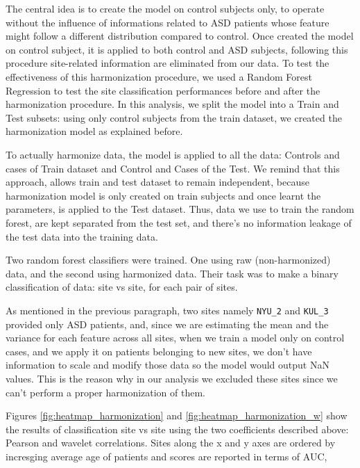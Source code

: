 \documentclass[11pt]{report}
\begin{document}
The central idea is to create the model on control subjects only, to operate without the influence of informations related to ASD patients whose feature might follow a different distribution compared to control.
Once created the model on control subject, it is applied to both control and ASD subjects, following this procedure site-related information are eliminated from our data.
To test the effectiveness of this harmonization procedure, we used a Random Forest Regression to test the site classification performances before and after the harmonization procedure.
In this analysis, we split the model into a Train and Test subsets: using only control subjects from the train dataset, we created the harmonization model as explained before.

To actually harmonize data, the model is applied to all the data: Controls and cases of Train dataset and Control and Cases of the Test.
We remind that this approach, allows train and test dataset to remain independent, because harmonization model is only created on train subjects and once learnt the parameters, is applied to the Test dataset. Thus, data we use to train the random forest, are kept separated from the test set, and there's no information leakage of the test data into the training data.

Two random forest classifiers were trained. One using raw (non-harmonized) data, and the second using harmonized data.
Their task was to make a binary classification of data: site vs site, for each pair of sites.


\begin{notes}
\item As mentioned in the previous paragraph, two sites namely \texttt{NYU\_2} and \texttt{KUL\_3} provided only ASD patients, and, since we are estimating the mean and the variance for each feature across all sites, when we train a model only on control cases, and we apply it on patients belonging to new sites, we don't have information to scale and modify those data so the model would output NaN values.
This is the reason why in our analysis we excluded these sites since we can't perform a proper harmonization of them.
\end{notes}

Figures \ref{fig:heatmap_harmonization} and \ref{fig:heatmap_harmonization_w} show the results of classification site vs site using the two coefficients described above:  Pearson and wavelet correlations. Sites along the x and y axes are ordered by incresging average age of patients and scores are reported in terms of AUC,
\end{document}
